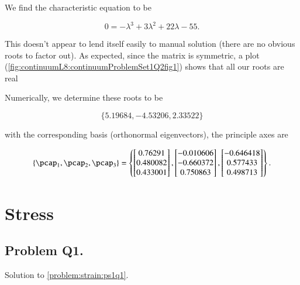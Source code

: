 We find the characteristic equation to be

\begin{equation}\label{eqn:continuumProblemSet1:290}
0 = -\lambda^3 + 3 \lambda^2 + 22\lambda - 55.
\end{equation}

This doesn't appear to lend itself easily to manual solution (there are no obvious roots to factor out).  As expected, since the matrix is symmetric, a plot (\ref{fig:continuumL8:continuumProblemSet1Q2fig1}) shows that all our roots are real


Numerically, we determine these roots to be

\begin{equation}\label{eqn:continuumProblemSet1:310}
\{5.19684, -4.53206, 2.33522\}
\end{equation}

with the corresponding basis (orthonormal eigenvectors), the principle axes are

\begin{equation}\label{eqn:continuumProblemSet1:330}
\left\{
\pcap_1,
\pcap_2,
\pcap_3
\right\}
=
\left\{
\begin{bmatrix}
0.76291 \\
0.480082 \\
0.433001
\end{bmatrix},
\begin{bmatrix}
-0.010606 \\
-0.660372 \\
0.750863
\end{bmatrix},
\begin{bmatrix}
-0.646418 \\
0.577433 \\
0.498713
\end{bmatrix}
\right\}.
\end{equation}


\chapter{Stress}

\label{solutions:ps1q1}
\section{Problem Q1.}

Solution to \ref{problem:strain:ps1q1}.

